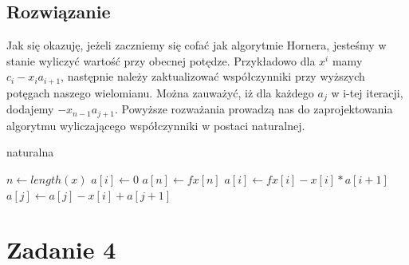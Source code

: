 \documentclass{article}
\begin{document}
\begin{center}
    \subsection{Rozwiązanie}
    \large Jak się okazuję, jeżeli zaczniemy się cofać jak algorytmie Hornera, jesteśmy w stanie wyliczyć wartość przy obecnej potędze.
     Przykładowo dla \(x^i\) mamy \(c_{i}-x_{i}a_{i+1}\), następnie należy zaktualizować współczynniki przy wyższych potęgach naszego wielomianu.
     Można zauważyć, iż dla każdego \(a_{j}\) w i-tej iteracji, dodajemy \(-x_{n-1}a_{j+1}\).
    Powyższe rozważania prowadzą nas do zaprojektowania algorytmu wyliczającego współczynniki w postaci naturalnej.
    \begin{flushleft}
        \begin{algorithm}
            \caption{naturalna}\label{alg:naturalna}
            \begin{algorithmic}
                \State$n \gets length(x)$
                    \State$a[i] \gets 0$
                \EndFor
                \State$a[n] \gets fx[n]$
                    \State$a[i] \gets fx[i] - x[i] * a[i+1]$
                        \State$a[j] \gets a[j] - x[i] + a[j+1]$
                    \EndFor
                \EndFor \newline
                \EndFunction
            \end{algorithmic}
        \end{algorithm}
    \end{flushleft}
    \newpage

    \section{Zadanie 4}

\end{center}
\end{document}
